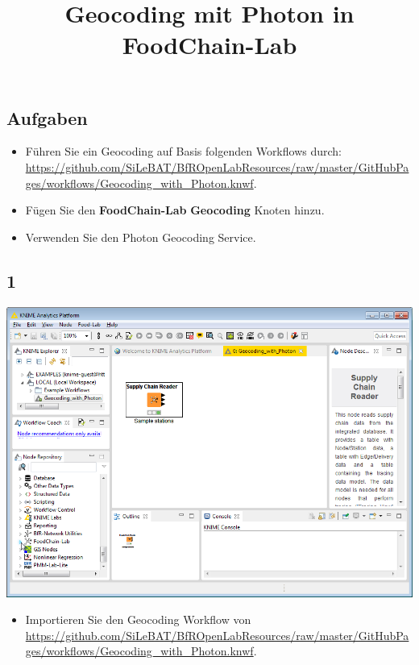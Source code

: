 \documentclass{beamer}
\title{Geocoding mit Photon in FoodChain-Lab}
\date{}
\begin{document}
\maketitle

\section{ }

\subsection{Aufgaben}
\begin{frame}
	\begin{itemize}
		\item Führen Sie ein Geocoding auf Basis folgenden Workflows durch: \url{https://github.com/SiLeBAT/BfROpenLabResources/raw/master/GitHubPages/workflows/Geocoding_with_Photon.knwf}.
		\item Fügen Sie den \textbf{FoodChain-Lab} \textbf{Geocoding} Knoten hinzu.
		\item Verwenden Sie den Photon Geocoding Service.
	\end{itemize}
\end{frame}
 
\subsection{1}
\begin{frame}
	\begin{center}
  		\includegraphics[height=0.6\textheight]{1.png}
	\end{center}
	\begin{itemize}
		\item Importieren Sie den Geocoding Workflow von \url{https://github.com/SiLeBAT/BfROpenLabResources/raw/master/GitHubPages/workflows/Geocoding_with_Photon.knwf}.
	\end{itemize}
\end{frame}
\end{document}
